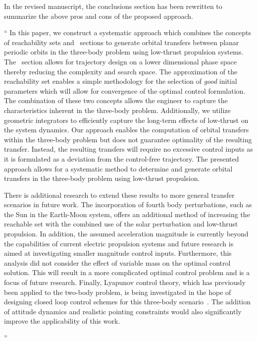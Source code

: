 \documentclass[11pt]{article}
\newenvironment{correction}{\begin{list}{}{\setlength{\leftmargin}{1cm}\setlength{\rightmargin}{1cm}}\vspace{\parsep}\item[]``}{''\end{list}}
\begin{document}
In the revised manuscript, the conclusions section has been rewritten to summarize the above pros and cons of the proposed approach. 
\begin{correction}
In this paper, we construct a systematic approach which combines the concepts of reachability sets and \Poincare~sections to generate orbital transfers between planar periodic orbits in the three-body problem using low-thrust propulsion systems.
The \Poincare~section allows for trajectory design on a lower dimensional phase space thereby reducing the complexity and search space.
The approximation of the reachability set enables a simple methodology for the selection of \textit{good} initial parameters which will allow for convergence of the optimal control formulation.
The combination of these two concepts allows the engineer to capture the characteristics inherent in the three-body problem.
Additionally, we utilize geometric integrators to efficiently capture the long-term effects of low-thrust on the system dynamics.
Our approach enables the computation of orbital transfers within the three-body problem but does not guarantee optimality of the resulting transfer.
Instead, the resulting transfers will require no excessive control inputs as it is formulated as a deviation from the control-free trajectory.
The presented approach allows for a systematic method to determine and generate orbital transfers in the three-body problem using low-thrust propulsion.

There is additional research to extend these results to more general transfer scenarios in future work.
The incorporation of fourth body perturbations, such as the Sun in the Earth-Moon system, offers an additional method of increasing the reachable set with the combined use of the solar perturbation and low-thrust propulsion.
In addition, the assumed acceleration magnitude is currently beyond the capabilities of current electric propulsion systems and future research is aimed at investigating smaller magnitude control inputs.
Furthermore, this analysis did not consider the effect of variable mass on the optimal control solution.
This will result in a more complicated optimal control problem and is a focus of future research.
Finally, Lyapunov control theory, which has previously been applied to the two-body problem, is being investigated in the hope of designing closed loop control schemes for this three-body scenario~\cite{chang2002}.
The addition of attitude dynamics and realistic pointing constraints would also significantly improve the applicability of this work.

\end{correction}
\end{document}
